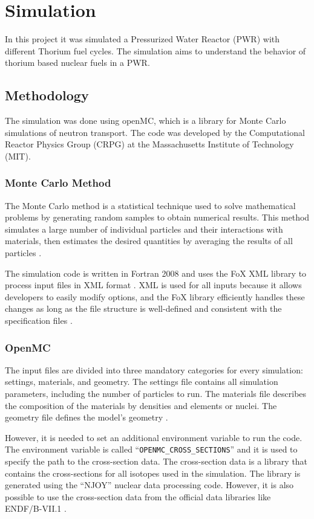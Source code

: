 \chapter{Simulation}
In this project it was simulated a Pressurized Water Reactor (PWR) with different Thorium fuel cycles. The simulation aims to understand the behavior of thorium based nuclear fuels in a PWR. 

\section{Methodology}
The simulation was done using openMC, which is a library for Monte Carlo simulations of neutron transport. The code was developed by the Computational Reactor Physics Group (CRPG) at the Massachusetts Institute of Technology (MIT). 

\subsection{Monte Carlo Method}
The Monte Carlo method is a statistical technique used to solve mathematical problems by generating random samples to obtain numerical results. This method simulates a large number of individual particles and their interactions with materials, then estimates the desired quantities by averaging the results of all particles \cite{TMSR_book}.

The simulation code is written in Fortran 2008 and uses the FoX XML library to process input files in XML format \cite{OpenMC}. XML is used for all inputs because it allows developers to easily modify options, and the FoX library efficiently handles these changes as long as the file structure is well-defined and consistent with the specification files \cite{OpenMC}.

\subsection{OpenMC}
The input files are divided into three mandatory categories for every simulation: settings, materials, and geometry. The settings file contains all simulation parameters, including the number of particles to run. The materials file describes the composition of the materials by densities and elements or nuclei. The geometry file defines the model's geometry \cite{OpenMC}.

However, it is needed to set an additional environment variable to run the code. The environment variable is called ``\texttt{OPENMC\_CROSS\_SECTIONS}'' and it is used to specify the path to the cross-section data. The cross-section data is a library that contains the cross-sections for all isotopes used in the simulation. The library is generated using the ``NJOY'' nuclear data processing code. However, it is also possible to use the cross-section data from the official data libraries like ENDF/B-VII.1 \cite{OpenMC}.

